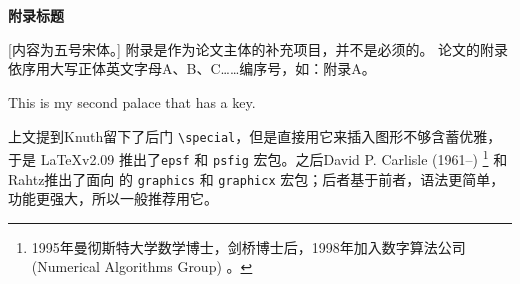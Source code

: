 \chapter[附录标题]{}
\begin{center}
	\bfseries 附录标题
\end{center}

[内容为五号宋体。] 附录是作为论文主体的补充项目，并不是必须的。
论文的附录依序用大写正体英文字母A、B、C……编序号，如：附录A。


This is my second palace that has a key.

上文提到Knuth留下了后门 \verb|\special|，但是直接用它来插入图形不够含蓄优雅，于是 \LaTeX v2.09 推出了\texttt{epsf} 和 \texttt{psfig} 宏包。之后David P. Carlisle (1961--) \footnote{1995年曼彻斯特大学数学博士，剑桥博士后，1998年加入数字算法公司 (Numerical Algorithms Group) 。} 和Rahtz推出了面向 \LaTeXe 的 \texttt{graphics} 和 \texttt{graphicx} 宏包；后者基于前者，语法更简单，功能更强大，所以一般推荐用它。


